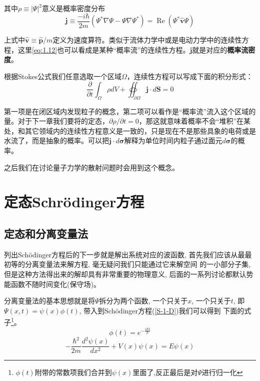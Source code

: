 \documentclass[a4paper,zihao=-4,linespread=1]{ctexrep}
\newenvironment{lequation}{\large\begin{equation}}{\end{equation}}
\begin{document}
	其中$\rho\equiv |\Psi|^2$意义是概率密度分布
	\begin{equation}
		\boxed{
			\mathbf{j}\equiv \frac{-i\hbar}{2m}\left(\Psi^*\nabla\Psi-\Psi\nabla\Psi^*\right)=\operatorname{Re}\left(\Psi^*\hat {\mathbf{v}}\Psi\right)
		}
	\end{equation}
	
	上式中$\hat {\mathbf{v}}\equiv \hat {\mathbf{p}}/m$定义为速度算符。类似于流体力学中或是电动力学中的连续性方程，这里\ref{eq:1.12}也可以看成是某种“概率流”的连续性方程。$\mathbf{j}$就是对应的\textbf{概率流密度}。
	
	根据Stokes公式我们任意选取一个区域$\Omega$，连续性方程可以写成下面的积分形式：
	\[\frac{\partial }{\partial t}\int_{\Omega}\rho dV+\oiint_{\partial\Omega}\mathbf{j}\cdot d\mathbf{S}=0\]
	
	第一项是在闭区域内发现粒子的概念，第二项可以看作是“概率流”流入这个区域的量。对于下一章我们要将的定态，$\partial \rho/\partial t=0$，那这就意味着概率不会“堆积”在某处，和其它领域内的连续性方程意义是一致的，只是现在不是那些具象的电荷或是水流了，而是抽象的概率。可以把$\mathbf{j}\cdot d\mathbf{\sigma}$解释为单位时间内粒子通过面元$ d\mathbf{\sigma}$的概率。
	
	之后我们在讨论量子力学的散射问题时会用到这个概念。
    \newpage
    \chapter{定态Schr\"{o}dinger方程}
    \section{定态和分离变量法}
    列出Sch\"{o}dinger方程后的下一步就是解出系统对应的波函数, 首先我们应该从最最初等的分离变量法来解方程, 毫无疑问我们只能通过它来解空间
    的一小部分子集, 但是这种方法得出来的解却具有非常重要的物理意义, 后面的一系列讨论都默认势能函数不随时间变化(保守场)。

    分离变量法的基本思想就是将$\Psi$拆分为两个函数, 一个只关于$x$, 一个只关于$t$, 即$\Psi(x,t)=\psi(x)\phi(t)$, 带入到Sch\"{o}dinger方程(\ref{S-1-D})我们可以得到
    下面的式子\footnote{$\phi(t)$附带的常数项我们合并到$\psi(x)$里面了,反正最后是对$\Psi$进行归一化}。
    \begin{lequation}
        \label{wiggle-function}
        \boxed{
            \phi(t)=e^{-\frac{iEt}{\hbar}}
        }
    \end{lequation}
    \begin{lequation}
        \label{time-independent-equation}
        \boxed{
            -\frac{\hbar^2}{2m}\frac{d^2\psi(x)}{dx^2}+V(x)\psi(x)=E\psi(x)
        }
    \end{lequation}
\end{document}
